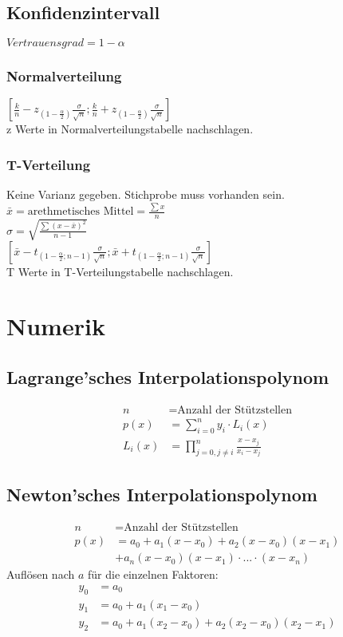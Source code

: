 \documentclass[a4paper, landscape, 10pt]{article}
\begin{document}
\begin{multicols}{5}
\begin{small}
    	\subsection{Konfidenzintervall}
	    	$Vertrauensgrad=1-\alpha$
	    	\subsubsection{Normalverteilung}
		    $[\frac{k}{n}-z_{(1-\frac{\alpha}{2})}\frac{\sigma}{\sqrt{n}};\frac{k}{n}+z_{(1-\frac{\alpha}{2})}\frac{\sigma}{\sqrt{n}}]$\\
		    z Werte in Normalverteilungstabelle nachschlagen. 
	    	\subsubsection{T-Verteilung}
	    	Keine Varianz gegeben. Stichprobe muss vorhanden sein.\\
		    $\bar{x}=\text{arethmetisches Mittel}=\frac{\sum x}{n}$\\
		    $\sigma=\sqrt{\frac{\sum(x-\bar{x})^{2}}{n-1}}$\\
		    $[\bar{x}-t_{(1-\frac{\alpha}{2};n-1)}\frac{\sigma}{\sqrt{n}};\bar{x}+t_{(1-\frac{\alpha}{2};n-1)}\frac{\sigma}{\sqrt{n}}]$\\
		    T Werte in T-Verteilungstabelle nachschlagen.
		    
		    	
	    	
	\section{Numerik}
		\subsection{Lagrange'sches Interpolationspolynom}
			\begin{align*}
			n &= \text{Anzahl der Stützstellen}\\
			p(x) &= \sum_{i=0}^{n} y_i \cdot L_i(x) \\
			L_i(x) &= \prod_{j = 0, j \neq i}^{n} \frac{x - x_j}{x_i - x_j}
			\end{align*}
		\subsection{Newton'sches Interpolationspolynom}
			\begin{align*}
			n &= \text{Anzahl der Stützstellen}\\
			p(x) &= a_0 + a_1(x - x_0) + a_2(x - x_0)(x - x_1)\\
			     &+ a_n(x-x_0)(x - x_1)\cdot ... \cdot (x - x_n)
			\end{align*}
			     Auflösen nach $a$ für die einzelnen Faktoren:
			\begin{align*}
			y_0 &= a_0\\
			y_1 &= a_0 + a_1(x_1 - x_0)	\\
			y_2 &= a_0 + a_1(x_2 - x_0) + a_2(x_2 - x_0)(x_2 - x_1)
			\end{align*}

\end{small}
\end{multicols}
\end{document}

